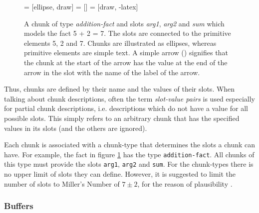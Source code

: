 \begin{figure}[hbt]
\centering
{} = [ellipse, draw]
 = [] 
 = [draw, -latex]   

\caption[A chunk of type \emph{addition-fact} and slots \emph{arg1}, \emph{arg2} and \emph{sum} which models the fact 5 + 2 = 7. The slots are connected to the primitive elements 5, 2 and 7.]{A chunk of type \emph{addition-fact} and slots \emph{arg1}, \emph{arg2} and \emph{sum} which models the fact 5 + 2 = 7. The slots are connected to the primitive elements 5, 2 and 7. Chunks are illustrated as ellipses, whereas primitive elements are simple text. A simple arrow () signifies that the chunk at the start of the arrow has the value at the end of the arrow in the slot with the name of the label of the arrow.}
\label{fig:chunk_addition_fact}
\end{figure}


Thus, chunks are defined by their name and the values of their slots. When talking about chunk descriptions, often the term \emph{slot-value pairs} is used especially for partial chunk descriptions, i.e. descriptions which do not have a value for all possible slots. This simply refers to an arbitrary chunk that has the specified values in its slots (and the others are ignored).

Each chunk is associated with a chunk-type that determines the slots a chunk can have. For example, the fact in figure \ref{fig:chunk_addition_fact} has the type \verb|addition-fact|. All chunks of this type must provide the slots \verb|arg1|, \verb|arg2| and \verb|sum|. For the chunk-types there is no upper limit of slots they can define. However, it is suggested to limit the number of slots to Miller's Number \label{millers_number} of $7 \pm 2$, for the reason of plausibility \cite[230]{stewart_deconstructing_2007}. 

\subsubsection{Buffers}

